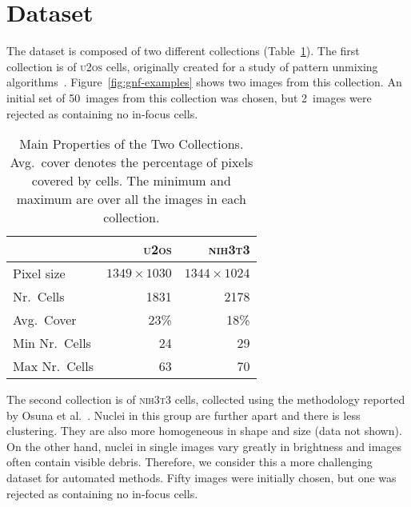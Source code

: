 \documentclass{article}
\newcommand*{\ttt}{\textsc{nih}{\footnotesize 3}\textsc{t}{\footnotesize 3}}
\newcommand*{\utos}{\textsc{u{\footnotesize 2}os}}
\begin{document}
\section{Dataset}\label{sec:format}

The dataset is composed of two different collections (Table~\ref{tab:dataset}). The first collection is of \utos{} cells, originally created for a study of pattern unmixing algorithms~\cite{TaoBonami}. Figure~\ref{fig:gnf-examples} shows two images from this collection. An initial set of 50~images from this collection was chosen, but 2~images were rejected as containing no in-focus cells.

\begin{table}
\centering
\begin{tabular}{lrr}
\toprule
& \utos{} & \ttt{} \\
\midrule
Pixel size           & $1349 \times 1030$ & $1344 \times 1024$ \\
Nr.\ Cells           &  1831              &  2178              \\
Avg.\ Cover          &   23\%             &    18\%            \\
Min Nr.\ Cells       &   24               &    29              \\
Max Nr.\ Cells       &   63               &    70              \\
\bottomrule
\end{tabular}
\caption{Main Properties of the Two Collections. Avg.\ cover denotes the percentage of pixels covered by cells. The minimum and maximum are over all the images in each collection.}
\label{tab:dataset}
\end{table}

\begin{figure*}
\begin{center}
\quad
{}
\end{center}%
\caption{Two example images from the \utos{} collection. (a) shows nuclei that are well separated. Automatic segmentation is expected to do well. (b)  has many clustered nuclei and is expected to challenge segmentation algorithms. Most images in the collection lie in between these two examples.}%
\label{fig:gnf-examples}%
\end{figure*}
The second collection is of \ttt{} cells, collected using the methodology reported by Osuna et al.~\cite{GarciaOsuna2007}. Nuclei in this group are further apart and there is less clustering. They are also more homogeneous in shape and size (data not shown). On the other hand, nuclei in single images vary greatly in brightness and images often contain visible debris. Therefore, we consider this a more challenging dataset for automated methods. Fifty images were initially chosen, but one was rejected as containing no in-focus cells.
\end{document}
